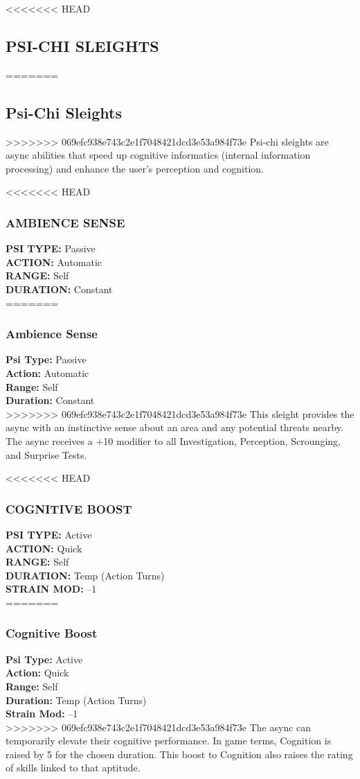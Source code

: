 <<<<<<< HEAD
\subsection{PSI-CHI SLEIGHTS}
=======
\subsection{Psi-Chi Sleights}
>>>>>>> 069efc938e743c2e1f7048421dcd3e53a984f73e
Psi-chi sleights are async abilities that speed up cognitive
informatics (internal information processing) and
enhance the user’s perception and cognition.

<<<<<<< HEAD
\subsubsection{AMBIENCE SENSE}
\textbf{PSI TYPE:} Passive \\ 
\textbf{ACTION:} Automatic \\ 
\textbf{RANGE:} Self \\ 
\textbf{DURATION:} Constant \\
=======
\subsubsection{Ambience Sense}
\textbf{Psi Type:} Passive \\ 
\textbf{Action:} Automatic \\ 
\textbf{Range:} Self \\ 
\textbf{Duration:} Constant \\
>>>>>>> 069efc938e743c2e1f7048421dcd3e53a984f73e
This sleight provides the async with an instinctive
sense about an area and any potential threats nearby.
The async receives a +10 modifier to all Investigation,
Perception, Scrounging, and Surprise Tests.

<<<<<<< HEAD
\subsubsection{COGNITIVE BOOST}
\textbf{PSI TYPE:} Active \\ 
\textbf{ACTION:} Quick \\ 
\textbf{RANGE:} Self \\ 
\textbf{DURATION:} Temp (Action Turns) \\
\textbf{STRAIN MOD:} –1 \\
=======
\subsubsection{Cognitive Boost}
\textbf{Psi Type:} Active \\ 
\textbf{Action:} Quick \\ 
\textbf{Range:} Self \\ 
\textbf{Duration:} Temp (Action Turns) \\
\textbf{Strain Mod:} –1 \\
>>>>>>> 069efc938e743c2e1f7048421dcd3e53a984f73e
The async can temporarily elevate their cognitive
performance. In game terms, Cognition is raised by 5
for the chosen duration. This boost to Cognition also
raises the rating of skills linked to that aptitude.

